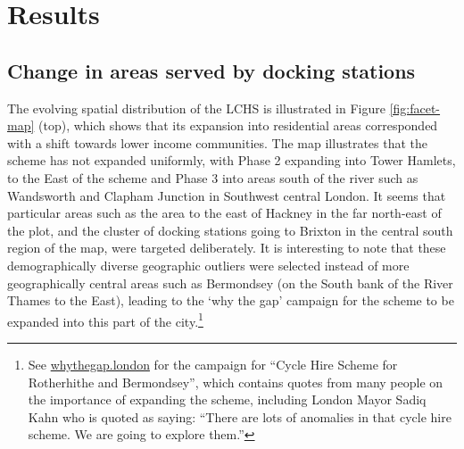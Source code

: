 \documentclass[
]{article}
\begin{document}
\hypertarget{results}{%
\section{Results}\label{results}}

\hypertarget{change-in-areas-served-by-docking-stations}{%
\subsection{Change in areas served by docking stations}\label{change-in-areas-served-by-docking-stations}}

The evolving spatial distribution of the LCHS is illustrated in Figure \ref{fig:facet-map} (top), which shows that its expansion into residential areas corresponded with a shift towards lower income communities.
The map illustrates that the scheme has not expanded uniformly, with Phase 2 expanding into Tower Hamlets, to the East of the scheme and Phase 3 into areas south of the river such as Wandsworth and Clapham Junction in Southwest central London.
It seems that particular areas such as the area to the east of Hackney in the far north-east of the plot, and the cluster of docking stations going to Brixton in the central south region of the map, were targeted deliberately.
It is interesting to note that these demographically diverse geographic outliers were selected instead of more geographically central areas such as Bermondsey (on the South bank of the River Thames to the East), leading to the `why the gap' campaign for the scheme to be expanded into this part of the city.\footnote{
  See \href{http://whythegap.london}{whythegap.london} for the campaign for ``Cycle Hire Scheme for Rotherhithe and Bermondsey'', which contains quotes from many people on the importance of expanding the scheme, including London Mayor Sadiq Kahn who is quoted as saying:
  ``There are lots of anomalies in that cycle hire scheme. We are going to explore them.''}
\end{document}

